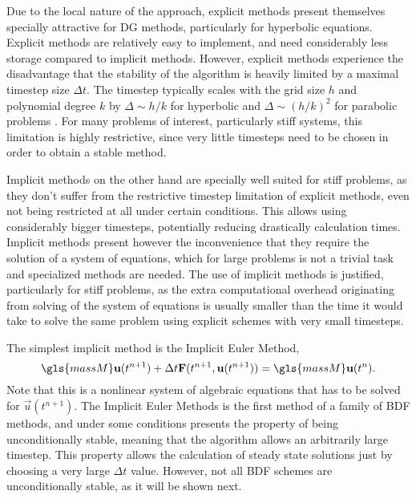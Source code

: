 Due to the local nature of the approach, explicit methods present themselves specially attractive for DG methods, particularly for hyperbolic equations. Explicit methods are relatively easy to implement, and need considerably less storage compared to implicit methods. However, explicit methods experience the disadvantage that the stability of the algorithm is heavily limited by a maximal timestep size $\Delta t$. The timestep typically scales with the grid size $h$ and polynomial degree $k$ by $\Delta \sim h/k$ for hyperbolic and $\Delta \sim (h/k)^2$ for parabolic problems \parencite{gassnerContributionConstructionDiffusion2007}. For many problems of interest, particularly stiff systems, this limitation is highly restrictive, since very little timesteps need to be chosen in order to obtain a stable method. 

Implicit methods  on the other hand are specially well suited for stiff problems, as they don't suffer from the restrictive timestep limitation of explicit methods, even not being restricted at all under certain conditions. This allows using considerably bigger timesteps, potentially reducing drastically calculation times. Implicit methods present however the inconvenience that they require the solution of a system of equations, which for large problems is not a trivial task and specialized methods are needed. The use of implicit methods is justified, particularly for stiff problems, as the extra computational overhead originating from solving of the system of equations is usually smaller than the time it would take to solve the same problem using explicit schemes with very small timesteps.

The simplest implicit method is the Implicit Euler Method,
\begin{equation}
\gls{massM}\vec{u}(t^{n+1}) + \Delta t\vec{F}(t^{n+1},\vec{u}(t^{n+1}))= \gls{massM}\vec{u}(t^{n}).
\end{equation}
Note that this is a nonlinear system of algebraic equations that has to be solved for $\vec{u}(t^{n+1})$. The Implicit Euler Methods is the first method of a family of \gls{BDF} methods, and under some conditions presents the property of being unconditionally stable, meaning that the algorithm allows an arbitrarily large timestep. This property allows the calculation of steady state solutions just by choosing a very large $\Delta t$ value. However, not all BDF schemes are unconditionally stable, as it will be shown next.
